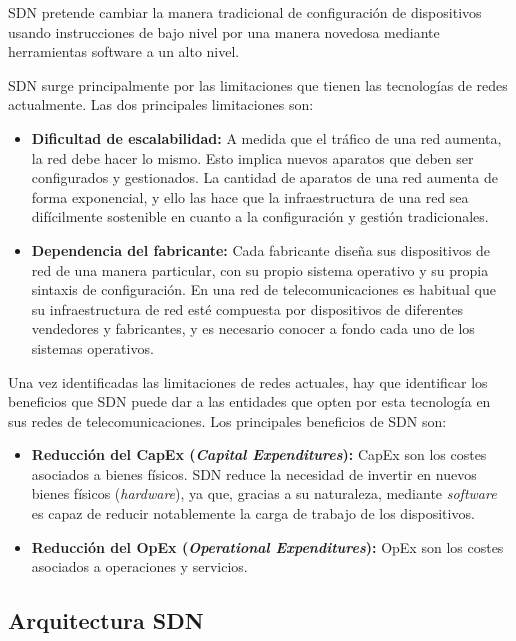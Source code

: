 SDN pretende cambiar la manera tradicional de configuración de dispositivos usando instrucciones de bajo nivel por una manera novedosa mediante herramientas software a un alto nivel.

SDN surge principalmente por las limitaciones que tienen las tecnologías de redes actualmente. Las dos principales limitaciones son:

\begin{itemize}
	\item \textbf{Dificultad de escalabilidad:} A medida que el tráfico de una red aumenta, la red debe hacer lo mismo. Esto implica nuevos aparatos que deben ser configurados y gestionados. La cantidad de aparatos de una red aumenta de forma exponencial, y ello las hace que la infraestructura de una red sea difícilmente sostenible en cuanto a la configuración y gestión tradicionales.
	
	\item \textbf{Dependencia del fabricante:} Cada fabricante diseña sus dispositivos de red de una manera particular, con su propio sistema operativo y su propia sintaxis de configuración. En una red de telecomunicaciones es habitual que su infraestructura de red esté compuesta por dispositivos de diferentes vendedores y fabricantes, y es necesario conocer a fondo cada uno de los sistemas operativos.
	
\end{itemize}

Una vez identificadas las limitaciones de redes actuales, hay que identificar los beneficios que SDN puede dar a las entidades que opten por esta tecnología en sus redes de telecomunicaciones. Los principales beneficios de SDN son:

\begin{itemize}
	\item \textbf{Reducción del CapEx (\textit{Capital Expenditures}):} CapEx son los costes asociados a bienes físicos. SDN reduce la necesidad de invertir en nuevos bienes físicos (\textit{hardware}), ya que, gracias a su naturaleza, mediante \textit{software} es capaz de reducir notablemente la carga de trabajo de los dispositivos.
	
	\item \textbf{Reducción del OpEx (\textit{Operational Expenditures}):} OpEx son los costes asociados a operaciones y servicios. 
\end{itemize}

\subsection{Arquitectura SDN}

